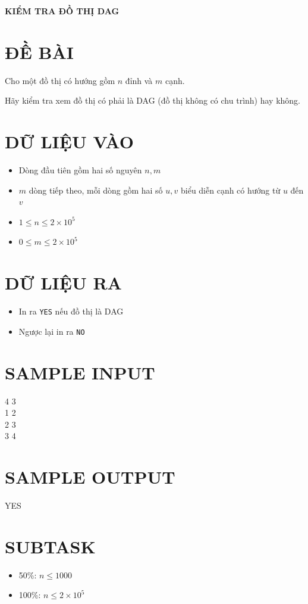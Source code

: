 \documentclass[a4paper,12pt]{article}
\begin{document}
\begin{center}
    \textbf{\Large KIỂM TRA ĐỒ THỊ DAG}
\end{center}

\section*{ĐỀ BÀI}
Cho một đồ thị có hướng gồm $n$ đỉnh và $m$ cạnh.

Hãy kiểm tra xem đồ thị có phải là DAG (đồ thị không có chu trình) hay không.

\section*{DỮ LIỆU VÀO}
\begin{itemize}
    \item Dòng đầu tiên gồm hai số nguyên $n, m$
    \item $m$ dòng tiếp theo, mỗi dòng gồm hai số $u, v$ biểu diễn cạnh có hướng từ $u$ đến $v$
    \item $1 \le n \le 2 \times 10^5$
    \item $0 \le m \le 2 \times 10^5$
\end{itemize}

\section*{DỮ LIỆU RA}
\begin{itemize}
    \item In ra \texttt{YES} nếu đồ thị là DAG
    \item Ngược lại in ra \texttt{NO}
\end{itemize}

\section*{SAMPLE INPUT}
\begin{tcolorbox}
4 3 \\
1 2 \\
2 3 \\
3 4
\end{tcolorbox}

\section*{SAMPLE OUTPUT}
\begin{tcolorbox}
YES
\end{tcolorbox}

\section*{SUBTASK}
\begin{itemize}
    \item 50\%: $n \le 1000$
    \item 100\%: $n \le 2 \times 10^5$
\end{itemize}
\end{document}
